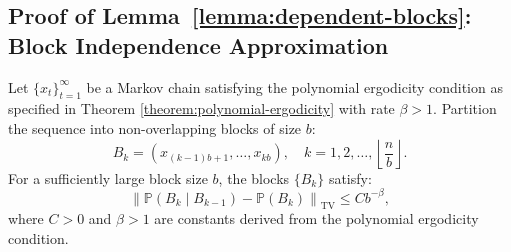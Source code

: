 \subsection{Proof of Lemma~\ref{lemma:dependent-blocks}: Block Independence Approximation}
\label{app:proof-block-independence-approximation}

\begin{lemmaapp*}
Let \(\{x_t\}_{t=1}^\infty\) be a Markov chain satisfying the polynomial ergodicity condition as specified in Theorem \ref{theorem:polynomial-ergodicity} with rate \(\beta > 1\). Partition the sequence into non-overlapping blocks of size \(b\):
\[
B_k = (x_{(k-1)b + 1}, \ldots, x_{kb}), \quad k = 1, 2, \ldots, \left\lfloor \frac{n}{b} \right\rfloor.
\]
For a sufficiently large block size \(b\), the blocks \(\{B_k\}\) satisfy:
\[
\left\| \mathbb{P}(B_k \mid B_{k-1}) - \mathbb{P}(B_k) \right\|_{\text{TV}} \leq C b^{-\beta},
\]
where \(C > 0\) and \(\beta > 1\) are constants derived from the polynomial ergodicity condition.
\end{lemmaapp*}


